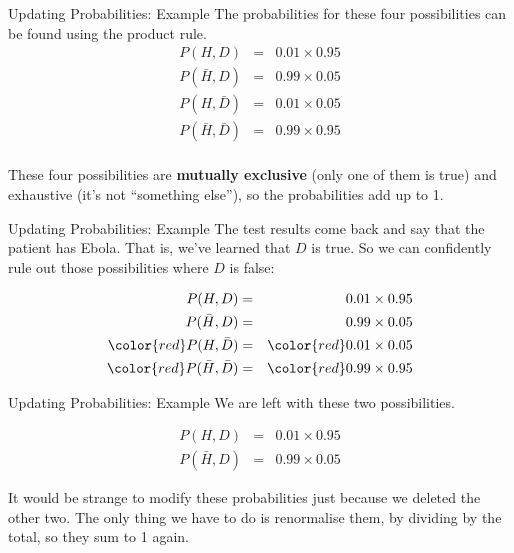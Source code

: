 \begin{frame}[t]{Updating Probabilities: Example}
The probabilities for these four possibilities can be found using the product
rule.
\begin{eqnarray*}
P(H, D) &=& 0.01 \times 0.95\\
P(\bar{H}, D) &=& 0.99 \times 0.05\\
P(H, \bar{D}) &=& 0.01 \times 0.05\\
P(\bar{H}, \bar{D}) &=& 0.99 \times 0.95\\
\end{eqnarray*}
\vspace{-45pt}

These four possibilities are {\bf mutually exclusive} (only one of them is true)
and exhaustive (it's not ``something else''), so the probabilities add up to 1.

\end{frame}

\begin{frame}[t]{Updating Probabilities: Example}
The test results come back and say that the patient has Ebola. That is, we've
learned that $D$ is true. So we can confidently rule out those possibilities
where $D$ is false:

\begin{eqnarray*}
P(H, D) &=& 0.01 \times 0.95\\
P(\bar{H}, D) &=& 0.99 \times 0.05\\
{\color{red} P(H, \bar{D})} &=& {\color{red} 0.01 \times 0.05}\\
{\color{red} P(\bar{H}, \bar{D})} &=& {\color{red} 0.99 \times 0.95}\\
\end{eqnarray*}


\end{frame}


\begin{frame}[t]{Updating Probabilities: Example}
We are left with these two possibilities.

\begin{eqnarray*}
P(H, D) &=& 0.01 \times 0.95\\
P(\bar{H}, D) &=& 0.99 \times 0.05
\end{eqnarray*}

It would be strange to modify these probabilities just because we deleted the
other two. The only thing we have to do is renormalise them, by dividing by the total, so they sum to 1 again.
\end{frame}

